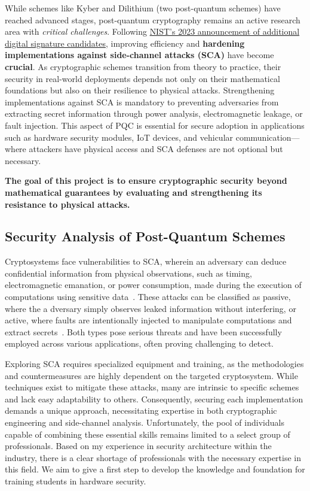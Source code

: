 \documentclass[11pt, a4paper]{article}
\begin{document}
While schemes like Kyber and Dilithium (two post-quantum schemes) have reached advanced stages, post-quantum cryptography 
remains an active research area with \emph{critical challenges}. Following \href{https://www.nist.gov/news-events/news/2023/07/nist-announces-additional-digital-signature-candidates-pqc-standardization}
{NIST's 2023 announcement of additional digital signature candidates}, 
improving efficiency and \textbf{hardening implementations against 
side-channel attacks (SCA)} have become \textbf{crucial}. As cryptographic schemes transition from 
theory to practice, their security in real-world deployments depends not only on their mathematical 
foundations but also on their resilience to physical attacks. Strengthening implementations against 
SCA is mandatory to preventing adversaries from extracting secret information through power analysis, 
electromagnetic leakage, or fault injection. This aspect of PQC is essential for secure adoption in 
applications such as hardware security modules, IoT devices, and vehicular communication—where 
attackers have physical access and SCA defenses are not optional but necessary. 

\textbf{The goal of this project is to ensure cryptographic security beyond mathematical 
guarantees by evaluating and strengthening its resistance to physical attacks.}

\subsection*{Security Analysis of Post-Quantum Schemes}\label{sec:an}\vspace{-0.1cm}

Cryptosystems face vulnerabilities to SCA, wherein an adversary can deduce 
confidential information from physical observations, such as timing,
electromagnetic emanation, or power consumption, made during the execution of 
computations using sensitive data~\cite{brumley2005remote, KocherJJR11,10.1007/3-540-48405-1_25}.
These attacks can be classified as passive, where the a
dversary simply observes leaked information without interfering, or active, 
where faults are intentionally injected to manipulate computations and extract 
secrets~\cite{4599557,6076462}. Both types pose serious threats and have been successfully employed 
across various applications, often proving challenging to detect.

Exploring SCA requires specialized equipment and training, as the 
methodologies and countermeasures are highly dependent on the 
targeted cryptosystem. While techniques exist to mitigate these 
attacks, many are intrinsic to specific schemes and lack easy 
adaptability to others. Consequently, securing each implementation 
demands a unique approach, necessitating expertise in both 
cryptographic engineering and side-channel analysis. Unfortunately, 
the pool of individuals capable of combining these essential skills 
remains limited to a select group of professionals. Based on my 
experience in security architecture within the industry, there is a 
clear shortage of professionals with the necessary expertise in this 
field. We aim to give a first step to develop the knowledge
and foundation for training students in hardware security.
\end{document}
